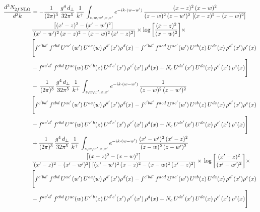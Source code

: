 \documentclass[9pt]{article}
\numberwithin{equation}{section}
\begin{document}
\begin{align}
    \frac{d^{3}N_{2f\,\rm NLO}^{\rm}}{d^{3}k}  & =   - \frac{1}{(2\pi)^{3}}\, \frac{g^{4}\,d_{\perp}}{32\pi^{5}}\,\frac{1}{k^{+}}\,\int_{z,w,w^{\prime},x,x'} e^{-ik\cdot (w-w')}\,\frac{(x-z)^{2}\, (x-w)^{2}}{(z-w)^{2}\, (z-w')^{2}\,\left[(x-z)^{2} - (x-w)^{2}\right]}\notag \\ & \frac{\left[(x'-z)^{2}-(x'-w')^{2}\right]}{\left[(x'-w')^{2}\, (x-z)^{2} - (x-w)^{2}\, (x'-z)^{2}\right]}\times \log{\left[\frac{(x-z)^{2}}{(x-w)^{2}}\right]}\times\notag \\ & \Bigg[f^{c'bd'}\,f^{cbd}\, U^{ac'}(w')\,U^{ac}(w)\,\rho^{d'}(x')\rho^{d}(x)- f^{c'bd'}\,f^{acd}\,U^{ac'}(w')\,U^{cb}(z)\,U^{de}(x)\,\rho^{d'}(x')\rho^{e}(x) \notag \\ & -f^{ac'd'}\,f^{cbd}\,U^{ac}(w)\,U^{c'b}(z)\,U^{d'e'}(x')\,\rho^{e'}(x')\,\rho^{d}(x) +N_{c}\,U^{de'}(x')\,U^{de}(x)\,\rho^{e'}(x')\,\rho^{e}(x)\Bigg]  \notag \\
& -\, \frac{1}{(2\pi)^{3}}\, \frac{g^{4}\,d_{\perp}}{32\pi^{5}}\,\frac{1}{k^{+}}\,\int_{z,w,w^{\prime},x,x'} e^{-ik\cdot (w-w')}\,\frac{1}{(z-w)^{2}\, (z-w')^{2}}\notag \\ & \Bigg[f^{c'bd'}\,f^{cbd}\, U^{ac'}(w')\,U^{ac}(w)\,\rho^{d'}(x')\rho^{d}(x)- f^{c'bd'}\,f^{acd}\,U^{ac'}(w')\,U^{cb}(z)\,U^{de}(x)\,\rho^{d'}(x')\rho^{e}(x) \notag \\ & -f^{ac'd'}\,f^{cbd}\,U^{ac}(w)\,U^{c'b}(z)\,U^{d'e'}(x')\,\rho^{e'}(x')\,\rho^{d}(x) +N_{c}\,U^{de'}(x')\,U^{de}(x)\,\rho^{e'}(x')\,\rho^{e}(x)\Bigg]  \notag \\
& + \frac{1}{(2\pi)^{3}}\, \frac{g^{4}\,d_{\perp}}{32\pi^{5}}\,\frac{1}{k^{+}}\,\int_{z,w,w^{\prime},x,x'} e^{-ik\cdot (w-w')}\,\frac{(x'-w')^{2}\, (x'-z)^{2}}{(z-w)^{2}\, (z-w')^{2}}\notag \\ & \frac{\left[(x-z)^{2} - (x-w)^{2}\right]}{\left[(x'-z)^{2} - (x'-w')^{2}\right]\, \left[(x'-w')^{2}\, (x - z)^{2} - (x-w)^{2}\,(x'-z)^{2}\right]}\times\, \log{\left[\frac{(x'-z)^{2}}{(x'-w')^{2}}\right]}\times \notag \\ &  \Bigg[f^{c'bd'}\,f^{cbd}\, U^{ac'}(w')\,U^{ac}(w)\,\rho^{d'}(x')\rho^{d}(x)- f^{c'bd'}\,f^{acd}\,U^{ac'}(w')\,U^{cb}(z)\,U^{de}(x)\,\rho^{d'}(x')\rho^{e}(x) \notag \\ & -f^{ac'd'}\,f^{cbd}\,U^{ac}(w)\,U^{c'b}(z)\,U^{d'e'}(x')\,\rho^{e'}(x')\,\rho^{d}(x) +N_{c}\,U^{de'}(x')\,U^{de}(x)\,\rho^{e'}(x')\,\rho^{e}(x)\Bigg]
\end{align}
\end{document}
